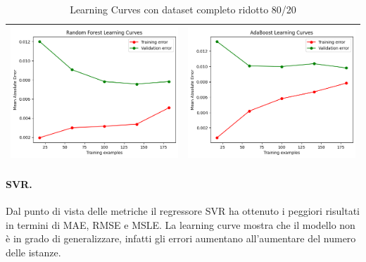 \begin{table}[H]
\begin{tabularx}{\textwidth}{|X|X|}
        \includegraphics[width=\linewidth, trim=0 0 0 0]{images/RandomForest_lc80_ridotto.png} &
        \includegraphics[width=\linewidth, trim=0 0 0 0]{images/AdaBoost_lc80_ridotto.png} \\
        \hline
    \end{tabularx}
    \caption{Learning Curves con dataset completo ridotto 80/20}
    \label{tab:emissions_info}
\end{table}

\paragraph{\textbf{SVR}.}
Dal punto di vista delle metriche il regressore SVR ha ottenuto i peggiori risultati in termini di MAE, RMSE e MSLE. La learning curve mostra che il modello non è in grado di generalizzare, infatti gli errori aumentano all'aumentare del numero delle istanze.

